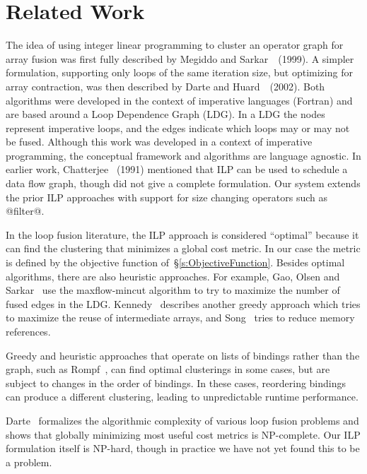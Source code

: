 \section{Related Work}
The idea of using integer linear programming to cluster an operator graph for array fusion was first fully described by Megiddo and Sarkar~\cite{megiddo1998optimal}~(1999).  A simpler formulation, supporting only loops of the same iteration size, but optimizing for array contraction, was then described by Darte and Huard~\cite{darte2002contraction}~(2002).  Both algorithms were developed in the context of imperative languages (Fortran) and are based around a Loop Dependence Graph (LDG).  In a LDG the nodes represent imperative loops, and the edges indicate which loops may or may not be fused.  Although this work was developed in a context of imperative programming, the conceptual framework and algorithms are language agnostic. In earlier work, Chatterjee~\cite{chatterjee1993nested} (1991) mentioned that ILP can be used to schedule a data flow graph, though did not give a complete formulation. Our system extends the prior ILP approaches with support for size changing operators such as @filter@.

In the loop fusion literature, the ILP approach is considered ``optimal'' because it can find the clustering that minimizes a global cost metric. In our case the metric is defined by the objective function of~\S\ref{s:ObjectiveFunction}. Besides optimal algorithms, there are also heuristic approaches. For example, Gao, Olsen and Sarkar~\cite{gao1993collective} use the maxflow-mincut algorithm to try to maximize the number of fused edges in the LDG.  Kennedy~\cite{kennedy2001fastgreedy} describes another greedy approach which tries to maximize the reuse of intermediate arrays, and Song~\cite{song2004improving} tries to reduce memory references.

Greedy and heuristic approaches that operate on lists of bindings rather than the graph, such as Rompf~\cite{rompf2013optimizing}, can find optimal clusterings in some cases, but are subject to changes in the order of bindings. In these cases, reordering bindings can produce a different clustering, leading to unpredictable runtime performance.

Darte~\cite{darte1999complexity} formalizes the algorithmic complexity of various loop fusion problems and shows that globally minimizing most useful cost metrics is NP-complete. Our ILP formulation itself is NP-hard, though in practice we have not yet found this to be a problem.

